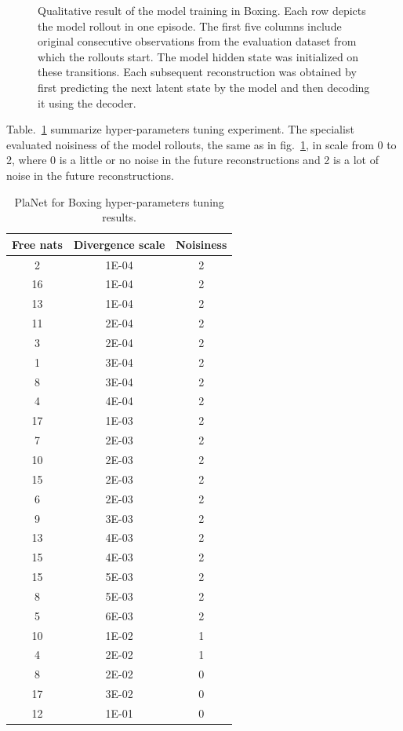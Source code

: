 \begin{figure}[H]
\caption[Qualitative result of the PlaNet model training with a lower divergence scale in Boxing]{Qualitative result of the model training in Boxing. Each row depicts the model rollout in one episode. The first five columns include original consecutive observations from the evaluation dataset from which the rollouts start. The model hidden state was initialized on these transitions. Each subsequent reconstruction was obtained by first predicting the next latent state by the model and then decoding it using the decoder.}
\label{Fig.PlaNet_Boxing_lower_divergence_scale}
\end{figure}

Table.~\ref{Table.PlaNet_Boxing_tuning} summarize hyper-parameters tuning experiment. The specialist evaluated noisiness of the model rollouts, the same as in fig.~\ref{Fig.PlaNet_Boxing_lower_divergence_scale}, in scale from 0 to 2, where 0 is a little or no noise in the future reconstructions and 2 is a lot of noise in the future reconstructions.

\begin{table}[H]
\centering
\begin{tabular}{| c | c | c |} 
\hline
Free nats & Divergence scale & Noisiness \\
\hline
2  & 1E-04 & 2 \\
16 & 1E-04 & 2 \\
13 & 1E-04 & 2 \\
11 & 2E-04 & 2 \\
3  & 2E-04 & 2 \\
1  & 3E-04 & 2 \\
8  & 3E-04 & 2 \\
4  & 4E-04 & 2 \\
17 & 1E-03 & 2 \\
7  & 2E-03 & 2 \\
10 & 2E-03 & 2 \\
15 & 2E-03 & 2 \\
6  & 2E-03 & 2 \\
9  & 3E-03 & 2 \\
13 & 4E-03 & 2 \\
15 & 4E-03 & 2 \\
15 & 5E-03 & 2 \\
8  & 5E-03 & 2 \\
5  & 6E-03 & 2 \\
10 & 1E-02 & 1 \\
4  & 2E-02 & 1 \\
8  & 2E-02 & 0 \\
17 & 3E-02 & 0 \\
12 & 1E-01 & 0 \\
\hline
\end{tabular}
\caption{PlaNet for Boxing hyper-parameters tuning results.}
\label{Table.PlaNet_Boxing_tuning}
\end{table}

